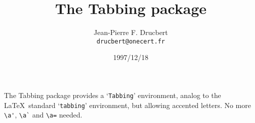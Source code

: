 \documentclass[DIV=7, fontsize=12pt, parskip=true, pagesize=auto]{scrartcl}
\title{The \textsf{Tabbing} package}
\author{Jean-Pierre F. Drucbert\\\texttt{drucbert@onecert.fr}}
\date{1997/12/18}
\begin{document}
\maketitle

The \textsf{Tabbing} package provides a `\texttt{Tabbing}' environment,
analog to the \LaTeX\ standard `\texttt{tabbing}' environment,
but allowing accented letters. No more \verb|\a'|, \verb|\a`|
and \verb|\a=| needed. 
\end{document}
